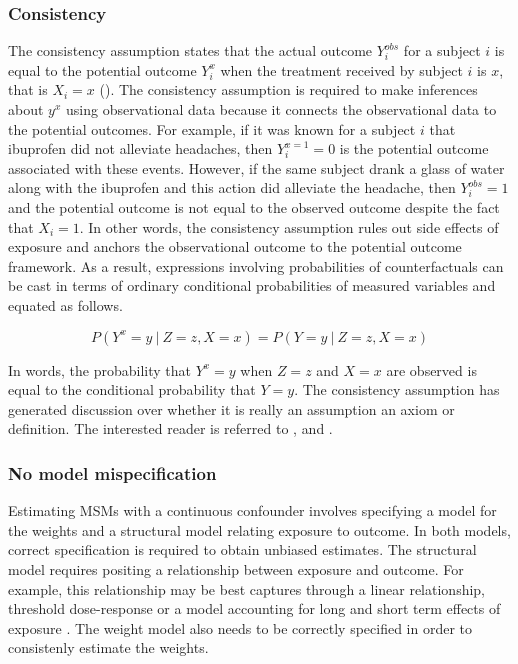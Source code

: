 \documentclass[11pt]{article}
\begin{document}
\subsubsection{Consistency}\label{consistency}

The consistency assumption states that the actual outcome
\(Y_{i}^{obs}\) for a subject \(i\) is equal to the potential outcome
\(Y_{i}^{x}\) when the treatment received by subject \(i\) is \(x\),
that is \(X_i = x\) (\citet{Cole2009}). The consistency assumption is
required to make inferences about \(y^{x}\) using observational data
because it connects the observational data to the potential outcomes.
For example, if it was known for a subject \(i\) that ibuprofen did not
alleviate headaches, then \(Y_{i}^{x=1} = 0\) is the potential outcome
associated with these events. However, if the same subject drank a glass
of water along with the ibuprofen and this action did alleviate the
headache, then \(Y_{i}^{obs} = 1\) and the potential outcome is not
equal to the observed outcome despite the fact that \(X_i=1\). In other
words, the consistency assumption rules out side effects of exposure and
anchors the observational outcome to the potential outcome framework. As
a result, expressions involving probabilities of counterfactuals can be
cast in terms of ordinary conditional probabilities of measured
variables \citet{Pearl2010} and equated as follows.

\[P(Y^x = y\ |\ Z = z, X = x) = P(Y = y\ |\ Z = z, X = x)\]

In words, the probability that \(Y^x = y\) when \(Z = z\) and \(X = x\)
are observed is equal to the conditional probability that \(Y = y\). The
consistency assumption has generated discussion over whether it is
really an assumption an axiom or definition. The interested reader is
referred to \citet{VanderWeele2009}, \citet{Cole2009} and
\citet{Pearl2010}.

\subsubsection{No model mispecification}\label{no-model-mispecification}

Estimating MSMs with a continuous confounder involves specifying a model
for the weights and a structural model relating exposure to outcome. In
both models, correct specification is required to obtain unbiased
estimates. The structural model requires positing a relationship between
exposure and outcome. For example, this relationship may be best
captures through a linear relationship, threshold dose-response or a
model accounting for long and short term effects of exposure
\citet{Cole2009}. The weight model also needs to be correctly specified
in order to consistenly estimate the weights.
\end{document}
